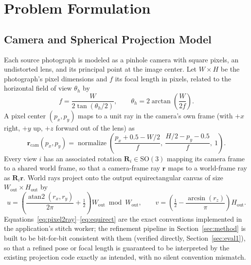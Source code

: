 \documentclass[11pt]{article}
\newcommand{\SO}{\mathrm{SO}(3)}
\newcommand{\vect}[1]{\mathbf{#1}}
\newcommand{\mat}[1]{\mathbf{#1}}
\begin{document}
\section{Problem Formulation}
\label{sec:formulation}

\subsection{Camera and Spherical Projection Model}
\label{sec:camera}

Each source photograph is modeled as a pinhole camera with square pixels, an undistorted lens, and its principal point at the image center. Let $W \times H$ be the photograph's pixel dimensions and $f$ its focal length in pixels, related to the horizontal field of view $\theta_h$ by
\begin{equation}
f = \frac{W}{2\tan(\theta_h/2)}, \qquad \theta_h = 2\arctan\!\left(\frac{W}{2f}\right).
\label{eq:focal}
\end{equation}
A pixel center $(p_x, p_y)$ maps to a unit ray in the camera's own frame (with $+x$ right, $+y$ up, $+z$ forward out of the lens) as
\begin{equation}
\vect{r}_{\mathrm{cam}}(p_x,p_y) = \operatorname{normalize}\!\left(\frac{p_x + 0.5 - W/2}{f},\ \frac{H/2 - p_y - 0.5}{f},\ 1\right).
\label{eq:pixel2ray}
\end{equation}
Every view $i$ has an associated rotation $\mat{R}_i \in \SO$ mapping its camera frame to a shared world frame, so that a camera-frame ray $\vect{r}$ maps to a world-frame ray as $\mat{R}_i \vect{r}$. World rays project onto the output equirectangular canvas of size $W_{\mathrm{out}} \times H_{\mathrm{out}}$ by
\begin{equation}
u = \left(\frac{\operatorname{atan2}(r_x, r_y)}{2\pi} + \tfrac{1}{2}\right) W_{\mathrm{out}} \bmod W_{\mathrm{out}}, \qquad
v = \left(\tfrac{1}{2} - \frac{\arcsin(r_z)}{\pi}\right) H_{\mathrm{out}}.
\label{eq:equirect}
\end{equation}
Equations~\eqref{eq:pixel2ray}--\eqref{eq:equirect} are the exact conventions implemented in the application's stitch worker; the refinement pipeline in Section~\ref{sec:method} is built to be bit-for-bit consistent with them (verified directly, Section~\ref{sec:eval1}), so that a refined pose or focal length is guaranteed to be interpreted by the existing projection code exactly as intended, with no silent convention mismatch.
\end{document}
